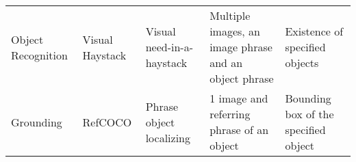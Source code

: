 \begin{table*}[t]
\begin{tabular}{lllll}
        \midrule
        \multirow{2}{1.8cm}{Object Recognition}    & \multirow{2}{1.5cm}{Visual Haystack} & \multirow{2}{*}{Visual need-in-a-haystack}                 & \multirow{2}{3.5cm}{Multiple images, an image phrase and an object phrase}                                                                  & \multirow{2}{2.3cm}{Existence of specified objects}    \\
                                                   &                                      &                                                            &                     &                                                        \\
        \midrule
        \multirow{2}{1.8cm}{Grounding}             & \multirow{2}{*}{RefCOCO}             & \multirow{2}{*}{Phrase object localizing}                  & \multirow{2}{3.5cm}{1 image and referring phrase of an object} & \multirow{2}{2.5cm}{Bounding box of the specified object} \\
                                                   &                                      &                                                            &                                                                   &                                                        \\

\end{tabular}
\end{table*}
